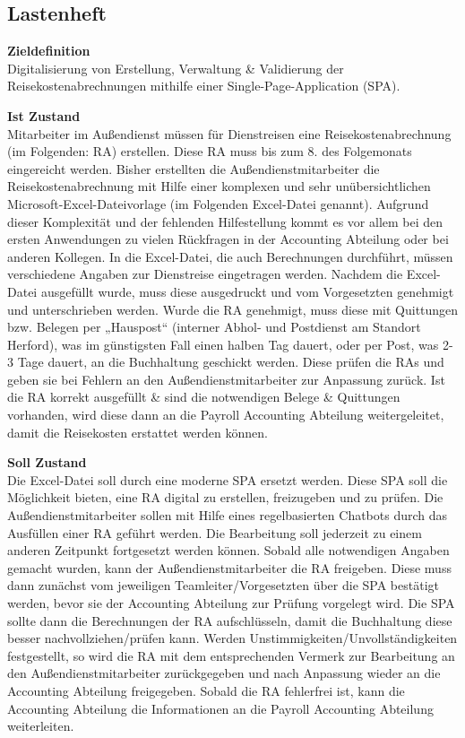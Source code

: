 \subsection{Lastenheft}
\label{sec:Anhang:Lastenheft}
\textbf{Zieldefinition}\\
Digitalisierung von Erstellung, Verwaltung \& Validierung der Reisekostenabrechnungen mithilfe einer Single-Page-Application (SPA).

\textbf{Ist Zustand}\\
Mitarbeiter im Außendienst müssen für Dienstreisen eine Reisekostenabrechnung (im Folgenden: RA) erstellen. Diese RA muss bis zum 8. des Folgemonats eingereicht werden. Bisher erstellten die Außendienstmitarbeiter die Reisekostenabrechnung mit Hilfe einer komplexen und sehr unübersichtlichen Microsoft-Excel-Dateivorlage (im Folgenden Excel-Datei genannt). Aufgrund dieser Komplexität und der fehlenden Hilfestellung kommt es vor allem bei den ersten Anwendungen zu vielen Rückfragen in der Accounting Abteilung oder bei anderen Kollegen. In die Excel-Datei, die auch Berechnungen durchführt, müssen verschiedene Angaben zur Dienstreise eingetragen werden. Nachdem die Excel-Datei ausgefüllt wurde, muss diese ausgedruckt und vom Vorgesetzten genehmigt und unterschrieben werden. Wurde die RA genehmigt, muss diese mit Quittungen bzw. Belegen per „Hauspost“ (interner Abhol- und Postdienst am Standort Herford), was im günstigsten Fall einen halben Tag dauert, oder per Post, was 2-3 Tage dauert, an die Buchhaltung geschickt werden.
Diese prüfen die RAs und geben sie bei Fehlern an den Außendienstmitarbeiter zur Anpassung zurück. Ist die RA korrekt ausgefüllt \& sind die notwendigen Belege \& Quittungen vorhanden, wird diese dann an die Payroll Accounting Abteilung weitergeleitet, damit die Reisekosten erstattet werden können.

\textbf{Soll Zustand}\\
Die Excel-Datei soll durch eine moderne SPA ersetzt werden. Diese SPA soll die Möglichkeit bieten, eine RA digital zu erstellen, freizugeben und zu prüfen. Die Außendienstmitarbeiter sollen mit Hilfe eines regelbasierten Chatbots durch das Ausfüllen einer RA geführt werden. Die Bearbeitung soll jederzeit zu einem anderen Zeitpunkt fortgesetzt werden können. Sobald alle notwendigen Angaben gemacht wurden, kann der Außendienstmitarbeiter die RA freigeben. Diese muss dann zunächst vom jeweiligen Teamleiter/Vorgesetzten über die SPA bestätigt werden, bevor sie der Accounting Abteilung zur Prüfung vorgelegt wird. Die SPA sollte dann die Berechnungen der RA aufschlüsseln, damit die Buchhaltung diese besser nachvollziehen/prüfen kann. Werden Unstimmigkeiten/Unvollständigkeiten festgestellt, so wird die RA mit dem entsprechenden Vermerk zur Bearbeitung an den Außendienstmitarbeiter zurückgegeben und nach Anpassung wieder an die Accounting Abteilung freigegeben. Sobald die RA fehlerfrei ist, kann die Accounting Abteilung die Informationen an die Payroll Accounting Abteilung weiterleiten. 

